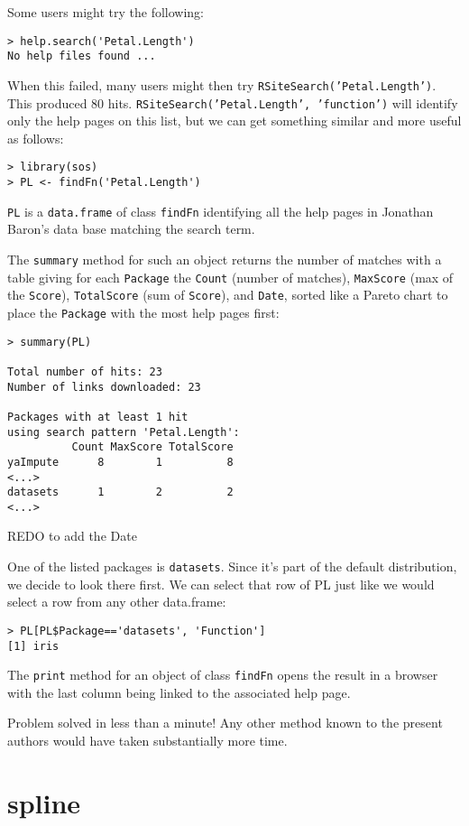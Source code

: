 Some users might try the following:  
\begin{verbatim}
> help.search('Petal.Length')
No help files found ...
\end{verbatim}
When this failed, many users might then try 
{\tt RSiteSearch('Petal.Length')}.  This produced 80 hits.  
{\tt RSiteSearch('Petal.Length', 'function')} will identify 
only the help pages on this list, but we can get something 
similar and more useful as follows:
\begin{verbatim}
> library(sos) 
> PL <- findFn('Petal.Length')
\end{verbatim}
{\tt PL} is a {\tt data.frame} of class {\tt findFn} identifying 
all the help pages in Jonathan Baron's data base matching the 
search term.  

The {\tt summary} method for such an object returns 
the number of matches with a table giving for each {\tt Package} 
the {\tt Count} (number of matches), {\tt MaxScore} (max of the 
{\tt Score}), {\tt TotalScore} (sum of {\tt Score}), and {\tt Date}, 
sorted like a Pareto chart to place the {\tt Package} with the most 
help pages first:  
\begin{verbatim}
> summary(PL)

Total number of hits: 23
Number of links downloaded: 23

Packages with at least 1 hit
using search pattern 'Petal.Length':
          Count MaxScore TotalScore
yaImpute      8        1          8
<...>
datasets      1        2          2
<...>
\end{verbatim}

REDO to add the Date  

One of the listed packages is {\tt datasets}.  Since it's part of the
default \R{} distribution, we decide to look there first.  We can
select that row of PL just like we would select a row from any other
data.frame:
\begin{verbatim}
> PL[PL$Package=='datasets', 'Function']
[1] iris
\end{verbatim}
The {\tt print} method for an object of class {\tt findFn} 
opens the result in a browser with the last column being linked 
to the associated help page.  

Problem solved in less than a minute!  Any other method known 
to the present authors would have taken substantially more time.  

\section*{spline}

